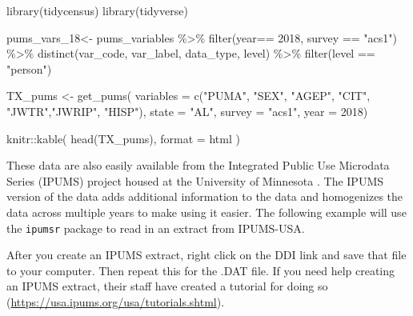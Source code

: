 \documentclass[
]{article}
\newenvironment{Shaded}{\begin{snugshade}}{\end{snugshade}}
\newcommand{\AttributeTok}[1]{\textcolor[rgb]{0.77,0.63,0.00}{#1}}
\newcommand{\DecValTok}[1]{\textcolor[rgb]{0.00,0.00,0.81}{#1}}
\newcommand{\FunctionTok}[1]{\textcolor[rgb]{0.00,0.00,0.00}{#1}}
\newcommand{\NormalTok}[1]{#1}
\newcommand{\OtherTok}[1]{\textcolor[rgb]{0.56,0.35,0.01}{#1}}
\newcommand{\SpecialCharTok}[1]{\textcolor[rgb]{0.00,0.00,0.00}{#1}}
\newcommand{\StringTok}[1]{\textcolor[rgb]{0.31,0.60,0.02}{#1}}
\begin{document}
\begin{Shaded}
\begin{Highlighting}[]
\FunctionTok{library}\NormalTok{(tidycensus)}
\FunctionTok{library}\NormalTok{(tidyverse)}

\NormalTok{pums\_vars\_18}\OtherTok{\textless{}{-}}\NormalTok{ pums\_variables }\SpecialCharTok{\%\textgreater{}\%}
  \FunctionTok{filter}\NormalTok{(year}\SpecialCharTok{==} \DecValTok{2018}\NormalTok{, survey }\SpecialCharTok{==} \StringTok{"acs1"}\NormalTok{) }\SpecialCharTok{\%\textgreater{}\%}
  \FunctionTok{distinct}\NormalTok{(var\_code, var\_label, data\_type, level) }\SpecialCharTok{\%\textgreater{}\%}
  \FunctionTok{filter}\NormalTok{(level }\SpecialCharTok{==} \StringTok{"person"}\NormalTok{)}

\NormalTok{TX\_pums }\OtherTok{\textless{}{-}} \FunctionTok{get\_pums}\NormalTok{(}
  \AttributeTok{variables =} \FunctionTok{c}\NormalTok{(}\StringTok{"PUMA"}\NormalTok{, }\StringTok{"SEX"}\NormalTok{, }\StringTok{"AGEP"}\NormalTok{, }\StringTok{"CIT"}\NormalTok{, }\StringTok{"JWTR"}\NormalTok{,}\StringTok{"JWRIP"}\NormalTok{, }\StringTok{"HISP"}\NormalTok{),}
  \AttributeTok{state =} \StringTok{"AL"}\NormalTok{,}
  \AttributeTok{survey =} \StringTok{"acs1"}\NormalTok{,}
  \AttributeTok{year =} \DecValTok{2018}\NormalTok{)}
\end{Highlighting}
\end{Shaded}

\begin{Shaded}
\begin{Highlighting}[]
\NormalTok{knitr}\SpecialCharTok{::}\FunctionTok{kable}\NormalTok{(}
  \FunctionTok{head}\NormalTok{(TX\_pums),}
  \AttributeTok{format =} \StringTok{\textquotesingle{}html\textquotesingle{}}
\NormalTok{  )}
\end{Highlighting}
\end{Shaded}

These data are also easily available from the Integrated Public Use Microdata Series (IPUMS) project housed at the University of Minnesota \citep{Ruggles2021}. The IPUMS version of the data adds additional information to the data and homogenizes the data across multiple years to make using it easier. The following example will use the \texttt{ipumsr} package to read in an extract from IPUMS-USA.

After you create an IPUMS extract, right click on the DDI link and save that file to your computer. Then repeat this for the .DAT file. If you need help creating an IPUMS extract, their staff have created a tutorial for doing so (\url{https://usa.ipums.org/usa/tutorials.shtml}).
\end{document}
